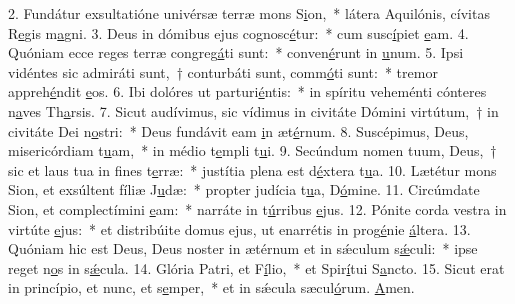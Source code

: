 2. Fundátur exsultatióne univérsæ terræ mons S\uline{i}on,~* látera Aquilónis, cívitas R\uline{e}gis m\uline{a}gni.
3. Deus in dómibus ejus cognosc\uline{é}tur:~* cum susc\uline{í}piet \uline{e}am.
4. Quóniam ecce reges terræ congreg\uline{á}ti sunt:~* conven\uline{é}runt in \uline{u}num.
5. Ipsi vidéntes sic admiráti sunt,~† conturbáti sunt, comm\uline{ó}ti sunt:~* tremor appreh\uline{é}ndit \uline{e}os.
6. Ibi dolóres ut parturi\uline{é}ntis:~* in spíritu veheménti cónteres n\uline{a}ves Th\uline{a}rsis.
7. Sicut audívimus, sic vídimus in civitáte Dómini virtútum,~† in civitáte Dei n\uline{o}stri:~* Deus fundávit eam \uline{i}n æt\uline{é}rnum.
8. Suscépimus, Deus, misericórdiam t\uline{u}am,~* in médio t\uline{e}mpli t\uline{u}i.
9. Secúndum nomen tuum, Deus,~† sic et laus tua in fines t\uline{e}rræ:~* justítia plena est d\uline{é}xtera t\uline{u}a.
10. Lætétur mons Sion, et exsúltent fíliæ J\uline{u}dæ:~* propter judícia t\uline{u}a, D\uline{ó}mine.
11. Circúmdate Sion, et complectímini \uline{e}am:~* narráte in t\uline{ú}rribus \uline{e}jus.
12. Pónite corda vestra in virtúte \uline{e}jus:~* et distribúite domus ejus, ut enarrétis in prog\uline{é}nie \uline{á}ltera.
13. Quóniam hic est Deus, Deus noster in ætérnum et in sǽculum s\uline{ǽ}culi:~* ipse reget n\uline{o}s in s\uline{ǽ}cula.
14. Glória Patri, et F\uline{í}lio,~* et Spir\uline{í}tui S\uline{a}ncto.
15. Sicut erat in princípio, et nunc, et s\uline{e}mper,~* et in sǽcula sæcul\uline{ó}rum. \uline{A}men.
